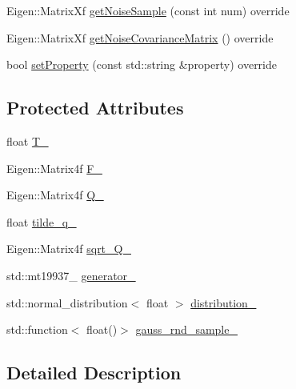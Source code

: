 \begin{DoxyCompactItemize}
\item 
Eigen\+::\+Matrix\+Xf \mbox{\hyperlink{classbfl_1_1WhiteNoiseAcceleration_ac4bf4116d3a88435b9d070cbc8736656}{get\+Noise\+Sample}} (const int num) override
\item 
Eigen\+::\+Matrix\+Xf \mbox{\hyperlink{classbfl_1_1WhiteNoiseAcceleration_a09c79104b153e6fb610bb2f1c6405636}{get\+Noise\+Covariance\+Matrix}} () override
\item 
bool \mbox{\hyperlink{classbfl_1_1WhiteNoiseAcceleration_a0203b47074e0680852f53dcba8a7a627}{set\+Property}} (const std\+::string \&property) override
\end{DoxyCompactItemize}
\subsection*{Protected Attributes}
\begin{DoxyCompactItemize}
\item 
float \mbox{\hyperlink{classbfl_1_1WhiteNoiseAcceleration_a7d1674033e2b6b1b8f245e910163aa0a}{T\+\_\+}}
\item 
Eigen\+::\+Matrix4f \mbox{\hyperlink{classbfl_1_1WhiteNoiseAcceleration_a02c209c5ca35170a096fc4ebe6754193}{F\+\_\+}}
\item 
Eigen\+::\+Matrix4f \mbox{\hyperlink{classbfl_1_1WhiteNoiseAcceleration_ad65c6f3766d7dd6d4b01bd84c3f0862d}{Q\+\_\+}}
\item 
float \mbox{\hyperlink{classbfl_1_1WhiteNoiseAcceleration_a5025cf01732a8ed99f4057fa6726f03e}{tilde\+\_\+q\+\_\+}}
\item 
Eigen\+::\+Matrix4f \mbox{\hyperlink{classbfl_1_1WhiteNoiseAcceleration_a209890197d296e25b22f0a04eec9bb0b}{sqrt\+\_\+\+Q\+\_\+}}
\item 
std\+::mt19937\+\_ \mbox{\hyperlink{classbfl_1_1WhiteNoiseAcceleration_a53532f567190af8a0baa579e3bd4e362}{generator\+\_\+}}
\item 
std\+::normal\+\_\+distribution$<$ float $>$ \mbox{\hyperlink{classbfl_1_1WhiteNoiseAcceleration_ad6d1649c319820d8f7cc9eb65666542f}{distribution\+\_\+}}
\item 
std\+::function$<$ float()$>$ \mbox{\hyperlink{classbfl_1_1WhiteNoiseAcceleration_a18feb2398836b38928e8e9fe367d5ab6}{gauss\+\_\+rnd\+\_\+sample\+\_\+}}
\end{DoxyCompactItemize}


\subsection{Detailed Description}


